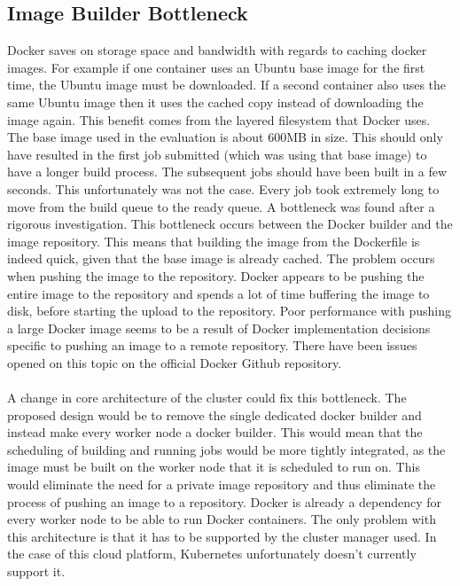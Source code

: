 \documentclass{sig-alternate-05-2015}
\begin{document}
%
%
%
\subsection{Image Builder Bottleneck}
Docker saves on storage space and bandwidth with regards to caching docker images. For example if one container uses an Ubuntu base image for the first time, the Ubuntu image must be downloaded. If a second container also uses the same Ubuntu image then it uses the cached copy instead of downloading the image again. This benefit comes from the layered filesystem that Docker uses. 
The base image used in the evaluation is about 600MB in size. This should only have resulted in the first job submitted (which was using that base image) to have a longer build process. The subsequent jobs should have been built in a few seconds. This unfortunately was not the case. Every job took extremely long to move from the build queue to the ready queue. A bottleneck was found after a rigorous investigation. This bottleneck occurs between the Docker builder and the image repository. This means that building the image from the Dockerfile is indeed quick, given that the base image is already cached. The problem occurs when pushing the image to the repository. Docker appears to be pushing the entire image to the repository and spends a lot of time buffering the image to disk, before starting the upload to the repository. Poor performance with pushing a large Docker image seems to be a result of Docker implementation decisions specific to pushing an image to a remote repository. There have been issues opened on this topic on the official Docker Github repository.
\\\\
A change in core architecture of the cluster could fix this bottleneck. The proposed design would be to remove the single dedicated docker builder and instead make every worker node a docker builder. This would mean that the scheduling of building and running jobs would be more tightly integrated, as the image must be built on the worker node that it is scheduled to run on. This would eliminate the need for a private image repository and thus eliminate the process of pushing an image to a repository. Docker is already a dependency for every worker node to be able to run Docker containers. The only problem with this architecture is that it has to be supported by the cluster manager used. In the case of this cloud platform, Kubernetes unfortunately doesn't currently support it. 
\end{document}

